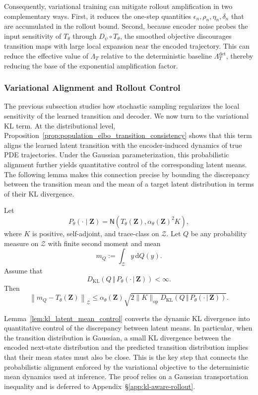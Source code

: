 \documentclass[11pt]{article}
\renewcommand{\d}{\mathrm{d}}
\begin{document}
Consequently, variational training can mitigate rollout amplification in two complementary ways. First, it reduces the one-step quantities $\epsilon_n, \rho_n, \eta_n, \delta_n$ that are accumulated in the rollout bound. Second, because encoder noise probes the input sensitivity of $T_\theta$ through $D_\psi\circ T_\theta$, the smoothed objective discourages transition maps with large local expansion near the encoded trajectory. This can reduce the effective value of $\Lambda_T$ relative to the deterministic baseline $\Lambda_T^{\mathrm{det}}$, thereby reducing the base of the exponential amplification factor.
\fi

\subsubsection{Variational Alignment and Rollout Control}
The previous subsection studies how stochastic sampling regularizes the local sensitivity of the learned transition and decoder. We now turn to the variational KL term. At the distributional level, Proposition~\ref{prop:population_elbo_transition_consistency} shows that this term aligns the learned latent transition with the encoder-induced dynamics of true PDE trajectories. Under the Gaussian parameterization, this probabilistic alignment further yields quantitative control of the corresponding latent means. The following lemma makes this connection precise by bounding the discrepancy between the transition mean and the mean of a target latent distribution in terms of their KL divergence.

\begin{lemma}
\label{lem:kl_latent_mean_control}
Let
\[
P_\theta(\cdot\mid\mathbf{Z})=\mathsf N\left(T_\theta(\mathbf{Z}),\alpha_\theta(\mathbf{Z})^2K\right),
\]
where $K$ is positive, self-adjoint, and trace-class on $\mathcal Z$. Let $Q$ be any probability measure on $\mathcal Z$ with finite second moment and mean
\[
    m_Q:=\int_{\mathcal Z} y\,\d Q(y).
\]
Assume that
\[
D_{\mathrm{KL}}\left(Q\,\Vert\,P_\theta(\cdot\,|\,\mathbf{Z})\right)<\infty .
\]
Then
\[
\left\|m_Q-T_\theta(\mathbf{Z})\right\|_{\mathcal Z}
\le\alpha_\theta(\mathbf{Z})\sqrt{
    2\|K\|_{\mathrm{op}}
    D_{\mathrm{KL}}
    \left(Q\,\Vert\,P_\theta(\cdot\,|\,\mathbf{Z})\right)
}.
\]
\end{lemma}
Lemma~\ref{lem:kl_latent_mean_control} converts the dynamic KL divergence into quantitative control of the discrepancy between latent means. In particular, when the transition distribution is Gaussian, a small KL divergence between the encoded next-state distribution and the predicted transition distribution implies that their mean states must also be close. This is the key step that connects the probabilistic alignment enforced by the variational objective to the deterministic mean dynamics used at inference. The proof relies on a Gaussian transportation inequality and is deferred to Appendix~\S\ref{app:kl-aware-rollout}.
\end{document}
